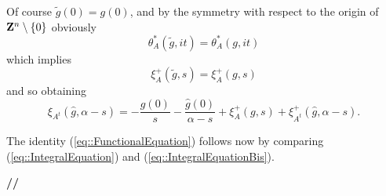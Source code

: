\documentclass[12pt,a4paper]{amsart}
\begin{document}
{Of course $\tilde{g}(0)={g}(0)$, and
by the symmetry with respect to the origin of
${{\bf Z}}^{n}\setminus\{0\}$ obviously
\begin{equation}\nonumber
{{\theta}_{{A}}^*\left({\tilde{g}},{i{t}}\right)}
={{\theta}_{{A}}^*\left({{g}},{i{t}}\right)}
\end{equation}
which implies
\begin{equation}\nonumber
{{\xi}_{{A}}^+\left({\tilde{g}},{s}\right)}
={{\xi}_{{A}}^+\left({g},{s}\right)}
\end{equation}
and so obtaining
\begin{equation}\label{eq::IntegralEquationBis}
{{\xi}_{{{\left.{{A}}\right.}^t}}\left({\hat{g}},{{\alpha}-{s}}\right)}=
-\frac{{g}(0)}{s}
-\frac{\hat{g}(0)}{{\alpha}-{s}}
+{{\xi}_{{A}}^+\left({g},{s}\right)}
+{{\xi}_{{{\left.{{A}}\right.}^t}}^+\left({\hat{g}},{{\alpha}-{s}}\right)}.
\end{equation}

The identity (\ref{eq::FunctionalEquation}) 
follows now by comparing 
(\ref{eq::IntegralEquation}) and (\ref{eq::IntegralEquationBis}).

{{\bf //}\par\smallskip}

}
\end{document}

